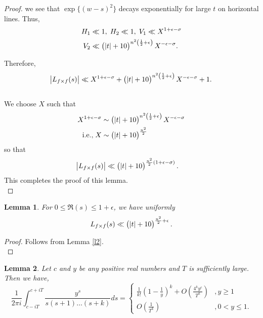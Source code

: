 \documentclass[sn-mathphys,Numbered]{sn-jnl}
\theoremstyle{thmstyleone}%
\newtheorem{lemma}{Lemma}[section]
\theoremstyle{thmstyletwo}%
\theoremstyle{thmstylethree}%
\begin{document}
\begin{proof}
we see that $\exp \{ (w-s)^2 \}$ decays exponentially for large $t$ on horizontal lines. Thus,
\begin{align*}
H_1 &\ll 1, \; H_2 \ll 1, \; V_1 \ll X^{1+\epsilon-\sigma} \\
V_2 &\ll \left(\, \abs{t}+10 \right)^{n^2 \left( \frac{1}{2} + \epsilon \right)} X^{-\epsilon-\sigma}.
\end{align*}

\noindent
Therefore,
$$ \abs{L_{f \times f}(s)} \ll X^{1+\epsilon-\sigma} + \left(\, \abs{t}+10 \right)^{n^2 \left( \frac{1}{2} + \epsilon \right)} X^{-\epsilon-\sigma} +1 .$$ \\

\noindent
We choose $X$ such that
\begin{align*}
X^{1+\epsilon-\sigma} &\sim \left(\, \abs{t}+10 \right)^{n^2 \left( \frac{1}{2} + \epsilon \right)} X^{-\epsilon-\sigma} \\
\text{i.e.,} \; X &\sim \left(\, \abs{t}+10 \right)^{\frac{n^2}{2}} 
\end{align*}
so that 
\begin{align*}
\abs{L_{f \times f}(s)} &\ll \left(\, \abs{t}+10 \right)^{\frac{n^2}{2}(1+\epsilon-\sigma)} .
\end{align*}
This completes the proof of this lemma. \\
\end{proof}

\begin{lemma} \label{l3}
For $0 \leq \Re(s) \leq 1+\epsilon$, we have uniformly 
$$ L_{f \times f}(s) \ll \left(\, \abs{t}+10 \right)^{\frac{n^2}{2} + \epsilon}.$$
\end{lemma}

\begin{proof}
Follows from Lemma \ref{l2}. \\
\end{proof}

\begin{lemma} \label{l4}
Let $c$ and $y$ be any positive real numbers and $T$ is sufficiently large. Then we have,
\begin{equation*}
\frac{1}{2 \pi i} \int_{c-iT}^{c+iT} \frac{y^s}{s(s+1) \dots (s+k)} ds = 
\begin{cases}
\frac{1}{k!} \left( 1-\frac{1}{y} \right)^k + O \left( \frac{4^ky^c}{T^k} \right) &, y \geq 1 \\
O \left( \frac{1}{T^k} \right) &, 0<y \leq 1.
\end{cases}
\end{equation*}
\end{lemma} 
\end{document}
